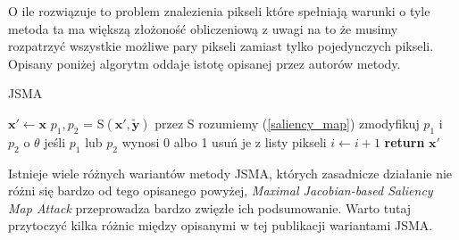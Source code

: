 \documentclass[
    left=2.5cm,         %
    right=2.5cm,        %
    top=2.5cm,          %
    bottom=3cm,         %
    bindingoffset=6mm,  %
    nohyphenation=false %
]{eiti/eiti-thesis}
\renewcommand{\vec}[1]{\mathbf{#1}}
\begin{document}
O ile rozwiązuje to problem znalezienia pikseli które spełniają warunki o tyle metoda ta ma większą złożoność obliczeniową
z uwagi na to że musimy rozpatrzyć wszystkie możliwe pary pikseli zamiast tylko pojedynczych pikseli.
Opisany poniżej algorytm oddaje istotę opisanej przez autorów metody.

\begin{algorithm}[H]
\caption{JSMA}\label{JSMA}
\begin{algorithmic}[1]
\State $\vec{x'} \gets \vec{x}$
\While{$f(\vec{x'}) \neq  \vec{\widetilde{y}}\ \& \ i < i_{max}$}
    \State $p_1, p_2$ = S$(\vec{x'},\vec{\widetilde{y}})$ \Comment przez S rozumiemy (\ref{saliency_map})
    \State zmodyfikuj $p_1$ i $p_2$ o $\theta$
    \State jeśli $p_1$ lub $p_2$ wynosi 0 albo 1 usuń je z listy pikseli
    \State $i \gets i+1$
\EndWhile
\State \textbf{return} $\vec{x'}$
\end{algorithmic}
\end{algorithm}

Istnieje wiele różnych wariantów metody JSMA, których zasadnicze działanie nie różni się bardzo od tego opisanego powyżej,
\textit{Maximal Jacobian-based Saliency Map Attack}\cite{DBLP:journals/corr/abs-1808-07945} przeprowadza bardzo
zwięzłe ich podsumowanie. Warto tutaj przytoczyć kilka różnic między opisanymi w tej publikacji
wariantami JSMA.
\end{document}
